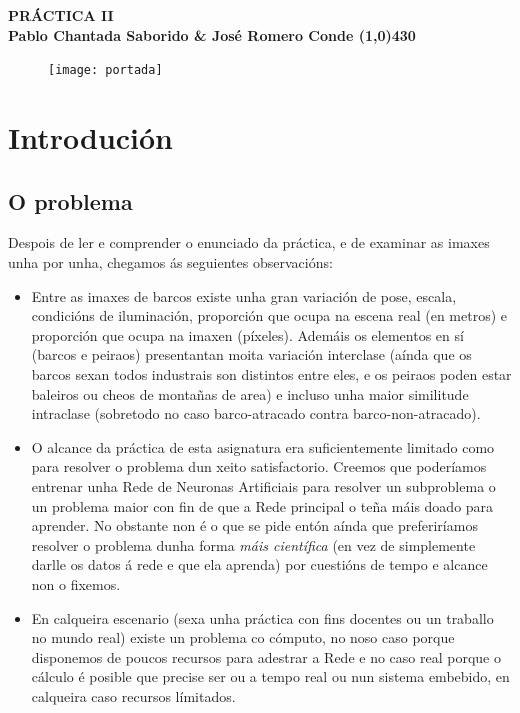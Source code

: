 \documentclass{article}
\begin{document}
	\begin{center}
		\LARGE\bfseries PRÁCTICA II\\
		\small Pablo Chantada Saborido \& José Romero Conde
		\line(1,0){430}
	\end{center}
	
\vspace*{380pt}
	
\begin{figure}[h]
	\centering
	\texttt{[image: portada]}
	\label{fig:portada}
\end{figure}
	
\thispagestyle{empty}
	
\newpage

\tableofcontents

\newpage
	
	
\section{Introdución}
\subsection{O problema}

Despois de ler e comprender o enunciado da práctica, e de examinar as imaxes unha por unha, chegamos ás seguientes observacións:
\begin{itemize}
	\item Entre as imaxes de barcos existe unha gran variación de pose, escala, condicións de iluminación, proporción que ocupa na escena real (en metros) e proporción que ocupa na imaxen (píxeles). Ademáis os elementos en sí (barcos e peiraos) presentantan moita variación interclase (aínda que os barcos sexan todos industrais son distintos entre eles, e os peiraos poden estar baleiros ou cheos de montañas de area) e incluso unha maior similitude intraclase (sobretodo no caso barco-atracado contra barco-non-atracado).
	\item O alcance da práctica de esta asignatura era suficientemente limitado como para resolver o problema dun xeito satisfactorio. Creemos que poderíamos entrenar unha Rede de Neuronas Artificiais para resolver un subproblema o un problema maior con fin de que a Rede principal o teña máis doado para aprender. No obstante non é o que se pide entón aínda que preferiríamos resolver o problema dunha forma \emph{máis científica} (en vez de simplemente darlle os datos á rede e que ela aprenda) por cuestións de tempo e alcance non o fixemos.
	\item En calqueira escenario (sexa unha práctica con fins docentes ou un traballo no mundo real) existe un problema co cómputo, no noso caso porque disponemos de poucos recursos para adestrar a Rede e no caso real porque o cálculo é posible que precise ser ou a tempo real ou nun sistema embebido, en calqueira caso recursos límitados. 
\end{itemize}
\end{document}
